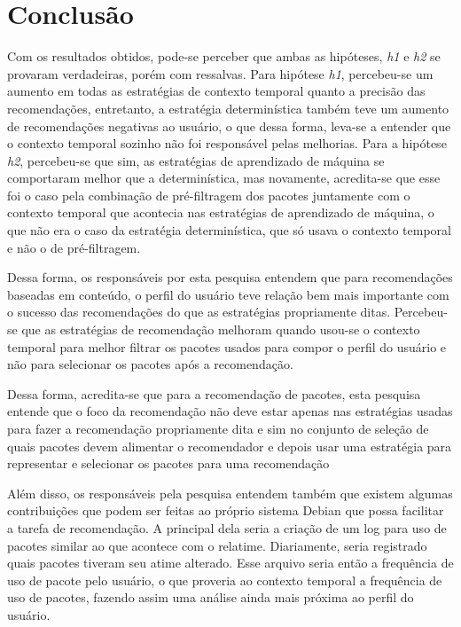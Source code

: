 \chapter[Conclusão]{Conclusão}

Com os resultados obtidos, pode-se perceber que ambas as hipóteses, \textit{h1}
e \textit{h2} se provaram verdadeiras, porém com ressalvas. Para hipótese
\textit{h1}, percebeu-se um aumento em todas as estratégias de contexto
temporal quanto a precisão das recomendações, entretanto, a estratégia
determinística também teve um aumento de recomendações negativas ao usuário, o
que dessa forma, leva-se a entender que o contexto temporal sozinho não foi
responsável pelas melhorias. Para a hipótese \textit{h2}, percebeu-se que sim,
as estratégias de aprendizado de máquina se comportaram melhor que a
determinística, mas novamente, acredita-se que esse foi o caso pela combinação
de pré-filtragem dos pacotes juntamente com o contexto temporal que acontecia
nas estratégias de aprendizado de máquina, o que não era o caso da estratégia
determinística, que só usava o contexto temporal e não o de pré-filtragem.

Dessa forma, os responsáveis por esta pesquisa entendem que para recomendações
baseadas em conteúdo, o perfil do usuário teve relação bem mais importante com o
sucesso das recomendações do que as estratégias propriamente ditas. Percebeu-se
que as estratégias de recomendação melhoram quando usou-se o contexto temporal
para melhor filtrar os pacotes usados para compor o perfil do usuário e não para
selecionar os pacotes após a recomendação.

Dessa forma, acredita-se que para a recomendação de pacotes, esta pesquisa
entende que o foco da recomendação não deve estar apenas nas estratégias usadas
para fazer a recomendação propriamente dita e sim no conjunto de seleção de
quais pacotes devem alimentar o recomendador e depois usar uma estratégia
para representar e selecionar os pacotes para uma recomendação

Além disso, os responsáveis pela pesquisa entendem também que existem algumas
contribuições que podem ser feitas ao próprio sistema Debian que possa facilitar
a tarefa de recomendação. A principal dela seria a criação de um log para uso de
pacotes similar ao que acontece com o relatime. Diariamente, seria registrado
quais pacotes tiveram seu atime alterado. Esse arquivo seria então a frequência
de uso de pacote pelo usuário, o que proveria ao contexto temporal a frequência
de uso de pacotes, fazendo assim uma análise ainda mais próxima ao perfil do
usuário.

